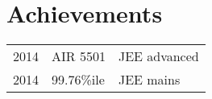 \documentclass[]{deedy-resume-openfont}
\begin{document}
\begin{minipage}[t]{0.66\textwidth}

\sectionsep


\section{Achievements} 

\begin{tabular}{rll}
2014 	& AIR 5501    & JEE advanced\\
2014   & 99.76\%ile   & JEE mains\\

\end{tabular}
\sectionsep

\end{minipage} 
\end{document}
